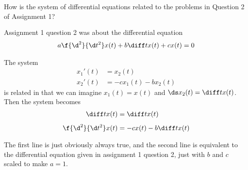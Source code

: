 \documentclass[a4paper]{article}
\begin{document}
\subsection{~} %

\begin{questionbody}
How is the system of differential equations related to the problems in Question 2 of Assignment 1?
\end{questionbody}

Assignment 1 question 2 was about the differential equation $$a \f{\d^2}{\d t^2}x(t) + b \diff t x(t) + cx(t) = 0$$

The system \begin{align*}
	x_1'(t) &= x_2(t)\\[1ex]
	x_2'(t) &= -c x_1(t) - b x_2(t)
\end{align*}is related in that we can imagine $x_1(t) = x(t)$ and $\ds x_2(t) = \diff t x(t)$. Then the system becomes \begin{align*}
	\diff t x(t)          &= \diff t x(t)\\[1ex]
	\f{\d^2}{\d t^2} x(t) &= -c x(t) - b \diff t x(t)
\end{align*}

The first line is just obviously always true, and the second line is equivalent to the differential equation given in assignment 1 question 2, just with $b$ and $c$ scaled to make $a=1$.
\end{document}
